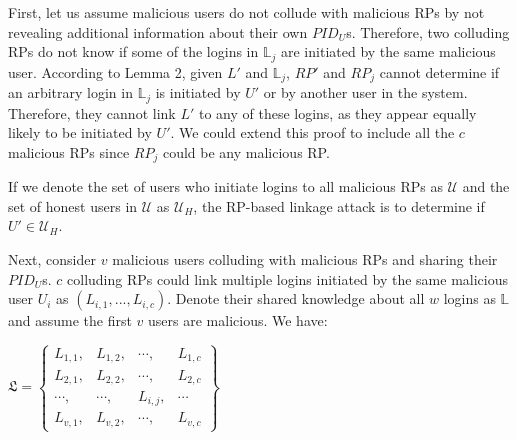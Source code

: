 First, let us assume malicious users do not collude with malicious RPs by not revealing additional information about their own $PID_U$s. Therefore, two colluding RPs do not know if some of the logins in $\mathbb{L}_j$ are initiated by the same malicious user. According to Lemma 2, given $L'$ and $\mathbb{L}_j$, $RP'$ and $RP_j$ cannot determine if an arbitrary login in $\mathbb{L}_j$ is initiated by $U'$ or by another user in the system. Therefore, they cannot link $L'$ to any of these logins, as they appear equally likely to be initiated by $U'$. We could extend this proof to include all the $c$ malicious RPs since $RP_j$ could be any malicious RP. 

If we denote the set of users who initiate logins to all malicious RPs as $\mathcal{U}$ and the set of honest users in $\mathcal{U}$ as $\mathcal{U}_H$, the RP-based linkage attack is to determine if $U' \in \mathcal{U}_H$.





Next, consider $v$ malicious users colluding with malicious RPs and sharing their $PID_U$s. $c$ colluding RPs could link multiple logins initiated by the same malicious user $U_i$ as $(L_{i,1},..., L_{i,c})$. Denote their shared knowledge about all $w$ logins as $\mathbb{L}$ and assume the first $v$ users are malicious. We have:

{\centering $\mathfrak{L}=\left \{ \begin{matrix} L_{1,1},&L_{1,2},&\cdots,&L_{1,c} \\
L_{2,1},& L_{2,2},&\cdots,&L_{2,c}  \\
\cdots,&\cdots,&L_{i,j},&\cdots  \\
L_{v,1},&L_{v,2},&\cdots,&L_{v,c}
\end{matrix}\right\}$
\par}

